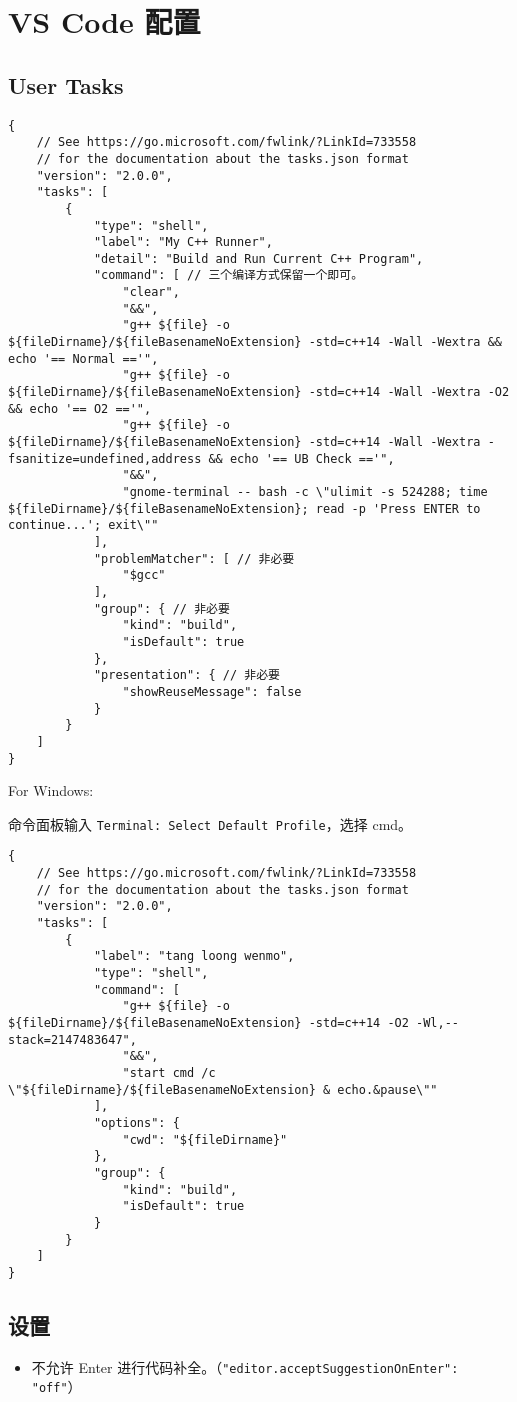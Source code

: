 \section{VS Code 配置}

\subsection{User Tasks}

\begin{verbatim}
{
    // See https://go.microsoft.com/fwlink/?LinkId=733558
    // for the documentation about the tasks.json format
    "version": "2.0.0",
    "tasks": [
        {
            "type": "shell",
            "label": "My C++ Runner",
            "detail": "Build and Run Current C++ Program",
            "command": [ // 三个编译方式保留一个即可。
                "clear",
                "&&",
                "g++ ${file} -o ${fileDirname}/${fileBasenameNoExtension} -std=c++14 -Wall -Wextra && echo '== Normal =='",
                "g++ ${file} -o ${fileDirname}/${fileBasenameNoExtension} -std=c++14 -Wall -Wextra -O2 && echo '== O2 =='",
                "g++ ${file} -o ${fileDirname}/${fileBasenameNoExtension} -std=c++14 -Wall -Wextra -fsanitize=undefined,address && echo '== UB Check =='",
                "&&",
                "gnome-terminal -- bash -c \"ulimit -s 524288; time ${fileDirname}/${fileBasenameNoExtension}; read -p 'Press ENTER to continue...'; exit\""
            ],
            "problemMatcher": [ // 非必要
                "$gcc"
            ],
            "group": { // 非必要
                "kind": "build",
                "isDefault": true
            },
            "presentation": { // 非必要
                "showReuseMessage": false
            }
        }
    ]
}
\end{verbatim}

For Windows:

命令面板输入 \lstinline|Terminal: Select Default Profile|，选择 cmd。

\begin{verbatim}
{
    // See https://go.microsoft.com/fwlink/?LinkId=733558
    // for the documentation about the tasks.json format
    "version": "2.0.0",
    "tasks": [
        {
            "label": "tang loong wenmo",
            "type": "shell",
            "command": [
                "g++ ${file} -o ${fileDirname}/${fileBasenameNoExtension} -std=c++14 -O2 -Wl,--stack=2147483647",
                "&&",
                "start cmd /c \"${fileDirname}/${fileBasenameNoExtension} & echo.&pause\""
            ],
            "options": {
                "cwd": "${fileDirname}"
            },
            "group": {
                "kind": "build",
                "isDefault": true
            }
        }
    ]
}
\end{verbatim}

\subsection{设置}

\begin{itemize}
    \item 不允许 Enter 进行代码补全。（\lstinline|"editor.acceptSuggestionOnEnter": "off"|）
\end{itemize}